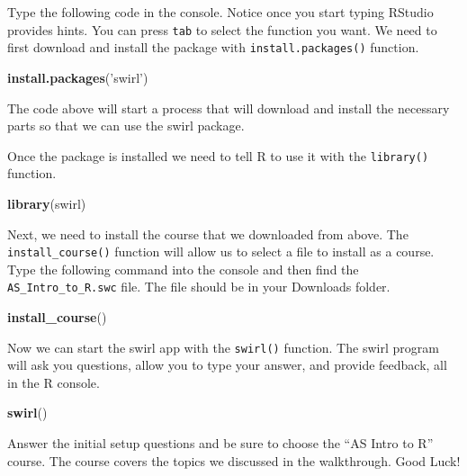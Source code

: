 \documentclass[]{book}
\newenvironment{Shaded}{\begin{snugshade}}{\end{snugshade}}
\newcommand{\KeywordTok}[1]{\textcolor[rgb]{0.13,0.29,0.53}{\textbf{#1}}}
\newcommand{\StringTok}[1]{\textcolor[rgb]{0.31,0.60,0.02}{#1}}
\newcommand{\NormalTok}[1]{#1}
\begin{document}
Type the following code in the console. Notice once you start typing
RStudio provides hints. You can press \texttt{tab} to select the
function you want. We need to first download and install the package
with \texttt{install.packages()} function.

\begin{Shaded}
\begin{Highlighting}[]
\KeywordTok{install.packages}\NormalTok{(}\StringTok{'swirl'}\NormalTok{)}
\end{Highlighting}
\end{Shaded}

The code above will start a process that will download and install the
necessary parts so that we can use the swirl package.

Once the package is installed we need to tell R to use it with the
\texttt{library()} function.

\begin{Shaded}
\begin{Highlighting}[]
\KeywordTok{library}\NormalTok{(swirl)}
\end{Highlighting}
\end{Shaded}

Next, we need to install the course that we downloaded from above. The
\texttt{install\_course()} function will allow us to select a file to
install as a course. Type the following command into the console and
then find the \texttt{AS\_Intro\_to\_R.swc} file. The file should be in
your Downloads folder.

\begin{Shaded}
\begin{Highlighting}[]
\KeywordTok{install_course}\NormalTok{()}
\end{Highlighting}
\end{Shaded}

Now we can start the swirl app with the \texttt{swirl()} function. The
swirl program will ask you questions, allow you to type your answer, and
provide feedback, all in the R console.

\begin{Shaded}
\begin{Highlighting}[]
\KeywordTok{swirl}\NormalTok{()}
\end{Highlighting}
\end{Shaded}

Answer the initial setup questions and be sure to choose the ``AS Intro
to R'' course. The course covers the topics we discussed in the
walkthrough. Good Luck!


\end{document}
